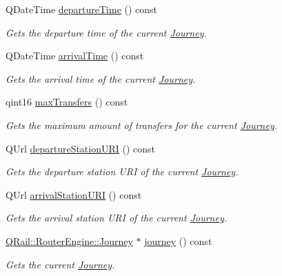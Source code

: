 \begin{DoxyCompactItemize}
Q\+Date\+Time \mbox{\hyperlink{classQRail_1_1RouterEngine_1_1Planner_af4816b0cc2e734bacb89d14c682ea7c5}{departure\+Time}} () const
\begin{DoxyCompactList}\small\item\em Gets the departure time of the current \mbox{\hyperlink{classQRail_1_1RouterEngine_1_1Journey}{Journey}}. \end{DoxyCompactList}\item 
Q\+Date\+Time \mbox{\hyperlink{classQRail_1_1RouterEngine_1_1Planner_adf7dbcaa92080558d1146422967d2cde}{arrival\+Time}} () const
\begin{DoxyCompactList}\small\item\em Gets the arrival time of the current \mbox{\hyperlink{classQRail_1_1RouterEngine_1_1Journey}{Journey}}. \end{DoxyCompactList}\item 
qint16 \mbox{\hyperlink{classQRail_1_1RouterEngine_1_1Planner_ab9a0ae139db0618220d8d069e983c394}{max\+Transfers}} () const
\begin{DoxyCompactList}\small\item\em Gets the maximum amount of transfers for the current \mbox{\hyperlink{classQRail_1_1RouterEngine_1_1Journey}{Journey}}. \end{DoxyCompactList}\item 
Q\+Url \mbox{\hyperlink{classQRail_1_1RouterEngine_1_1Planner_a6cd264c862d10323717ca3b978797d2e}{departure\+Station\+U\+RI}} () const
\begin{DoxyCompactList}\small\item\em Gets the departure station U\+RI of the current \mbox{\hyperlink{classQRail_1_1RouterEngine_1_1Journey}{Journey}}. \end{DoxyCompactList}\item 
Q\+Url \mbox{\hyperlink{classQRail_1_1RouterEngine_1_1Planner_ad9d45f498635d0310c699d9154c68b38}{arrival\+Station\+U\+RI}} () const
\begin{DoxyCompactList}\small\item\em Gets the arrival station U\+RI of the current \mbox{\hyperlink{classQRail_1_1RouterEngine_1_1Journey}{Journey}}. \end{DoxyCompactList}\item 
\mbox{\hyperlink{classQRail_1_1RouterEngine_1_1Journey}{Q\+Rail\+::\+Router\+Engine\+::\+Journey}} $\ast$ \mbox{\hyperlink{classQRail_1_1RouterEngine_1_1Planner_af3ae9c83f09d8dadabe6d0e24b22401e}{journey}} () const
\begin{DoxyCompactList}\small\item\em Gets the current \mbox{\hyperlink{classQRail_1_1RouterEngine_1_1Journey}{Journey}}. \end{DoxyCompactList}\item 

\end{DoxyCompactItemize}
